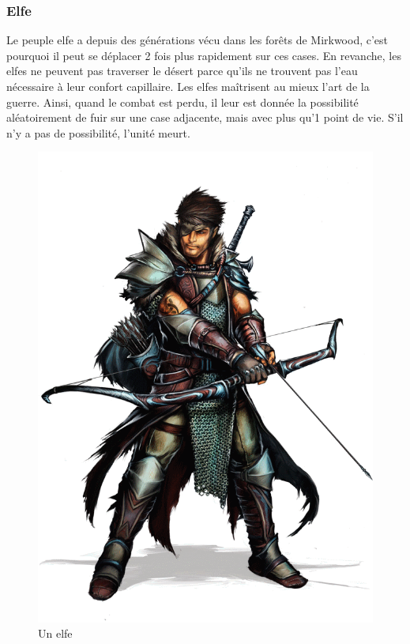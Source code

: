\newpage
\subsubsection{Elfe}
Le peuple elfe a depuis des générations vécu dans les forêts de Mirkwood, c'est pourquoi il peut se déplacer 2 fois plus rapidement sur ces cases.
\newline
 En revanche, les elfes ne peuvent pas traverser le désert parce qu'ils ne trouvent pas l'eau nécessaire à leur confort capillaire.
\newline
\newline
Les elfes maîtrisent au mieux l'art de la guerre. Ainsi, quand le combat est perdu, il leur est donnée la possibilité aléatoirement de fuir sur une case adjacente, mais avec plus qu'1 point de vie.
\newline
  S'il n'y a pas de possibilité, l'unité meurt.

\begin{figure}[!h]
\centering
\includegraphics[scale=0.10]{img/elf.png}
\caption{Un elfe}
\end{figure}

